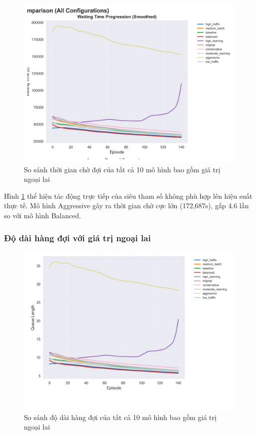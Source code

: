 \begin{figure}[!htp]
    \centering
    \includegraphics[width=\textwidth]{
        figures/individual_plots/intersection_full_waiting_time.png
    }
    \caption{So sánh thời gian chờ đợi của tất cả 10 mô hình bao gồm giá trị ngoại lai}
    \label{fig:intersection_full_waiting_time}
\end{figure}

Hình \ref{fig:intersection_full_waiting_time} thể hiện tác động trực tiếp của
siêu tham số không phù hợp lên hiệu suất thực tế. Mô hình Aggressive gây ra thời
gian chờ cực lớn (172,687s), gấp 4.6 lần so với mô hình Balanced.

\subsubsection{Độ dài hàng đợi với giá trị ngoại lai}

\begin{figure}[!htp]
    \centering
    \includegraphics[width=\textwidth]{
        figures/individual_plots/intersection_full_queue_length.png
    }
    \caption{So sánh độ dài hàng đợi của tất cả 10 mô hình bao gồm giá trị ngoại lai}
    \label{fig:intersection_full_queue_length}
\end{figure}

